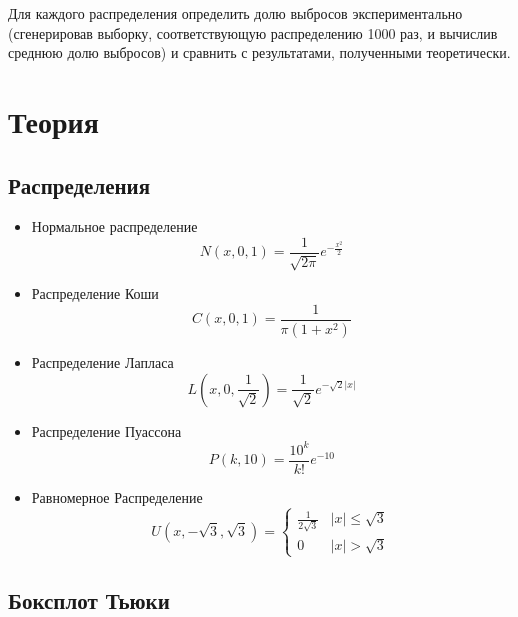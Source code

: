 \documentclass[12pt,a4paper]{article}
\begin{document}
	Для каждого распределения определить долю выбросов экспериментально (сгенерировав выборку, соответствующую распределению 1000 раз, и вычислив среднюю долю выбросов) и сравнить с результатами, полученными теоретически.
	
	\section{Теория}
	\subsection{Распределения}
	\begin{itemize}
		\item Нормальное распределение \begin{equation}\label{eqn:normal}
		N(x,0,1) = \frac{1}{\sqrt{2\pi}}e^{-\frac{x^2}{2}}
		\end{equation}
		
		\item Распределение Коши
		\begin{equation}\label{eqn:cauchy}
		C(x,0,1) = \frac{1}{\pi(1+x^2)}
		\end{equation}
		
		\item Распределение Лапласа
		\begin{equation}\label{eqn:laplace}
		L\left( x,0,\frac{1}{\sqrt{2}}\right) = \frac{1}{\sqrt{2}}e^{-\sqrt{2}\vert x\vert}
		\end{equation}
		
		\item Распределение Пуассона
		\begin{equation}\label{eqn:poisson}
		P(k,10) = \frac{10^k}{k!}e^{-10}
		\end{equation}
		
		\item Равномерное Распределение
		\begin{equation}\label{eqn:uniform}
		U(x,-\sqrt{3}, \sqrt{3}) = 
		\begin{cases}
		\frac{1}{2\sqrt{3}} &\vert x\vert \leqslant \sqrt{3}\\
		0 &\vert x\vert > \sqrt{3}
		\end{cases}
		\end{equation}
	\end{itemize}
	
	\subsection{Боксплот Тьюки}
\end{document}
